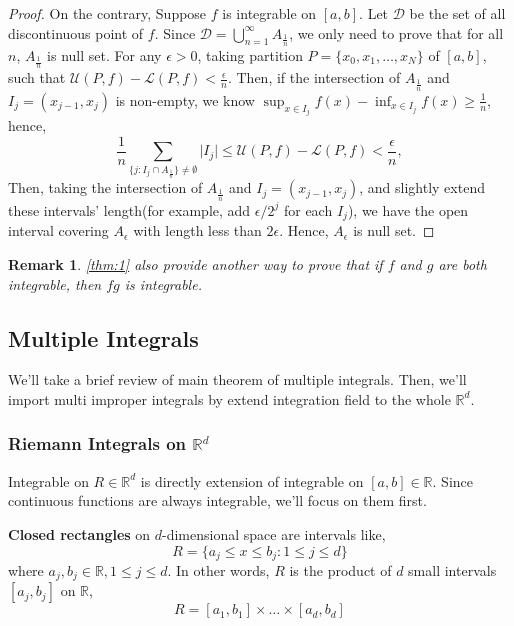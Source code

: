 \documentclass[a4paper]{article}
\newtheorem{remark}{Remark}
\numberwithin{equation}{subsection}
\begin{document}
\begin{proof}
\par On the contrary, Suppose $f$ is integrable on $[a,b]$. Let $\mathcal{D}$ be the set of all discontinuous point of $f$. Since $\mathcal{D} = \bigcup_{n=1}^\infty A_{\frac{1}{n}}$, we only need to prove that for all $n$, $A_{\frac{1}{n}}$ is null set. For any $\epsilon>0$, taking partition $P=\{x_0, x_1, \dots, x_N\}$ of $[a,b]$, such that $\mathcal{U}(P, f)-\mathcal{L}(P, f) < \frac{\epsilon}{n}$. Then, if the intersection of $A_{\frac{1}{n}}$ and $I_j=(x_{j-1}, x_j)$ is non-empty, we know $\sup_{x\in I_j} f(x) - \inf_{x\in I_j} f(x) \geq \frac{1}{n}$, hence,
\begin{equation}
    \frac{1}{n} \sum_{\{j: I_j \cap A_{\frac{1}{n}}\} \neq \emptyset} \lvert I_j \rvert \leq \mathcal{U}(P, f) - \mathcal{L}(P, f) < \frac{\epsilon}{n},
\end{equation}
Then, taking the intersection of $A_{\frac{1}{n}}$ and $I_j=(x_{j-1}, x_j)$, and slightly extend these intervals' length(for example, add $\epsilon/2^j$ for each $I_j$), we have the open interval covering $A_\epsilon$ with length less than $2\epsilon$. Hence, $A_\epsilon$ is null set.

\end{proof}

\begin{remark}
    \cref{thm:1} also provide another way to prove that if $f$ and $g$ are both integrable, then $fg$ is integrable.
\end{remark}

\subsection{Multiple Integrals}

\par We'll take a brief review of main theorem of multiple integrals. Then, we'll import multi improper integrals by extend integration field to the whole $\mathbb{R}^d$.

\subsubsection{Riemann Integrals on $\mathbb{R}^d$}

\par Integrable on $R \in \mathbb{R}^d$ is directly extension of integrable on $[a,b]\in\mathbb{R}$.  Since continuous functions are always integrable, we'll focus on them first.
\par \textbf{Closed rectangles} on $d$-dimensional space are intervals like,
\begin{equation}
    R = \{a_j \leq x \leq b_j : 1 \leq j \leq d\}
\end{equation}
where $a_j, b_j \in \mathbb{R}, 1\leq j \leq d$. In other words, $R$ is the product of $d$ small intervals $[a_j, b_j]$ on $\mathbb{R}$,
\begin{equation}
    R = [a_1, b_1] \times \dots \times [a_d, b_d]
\end{equation}
\end{document}
